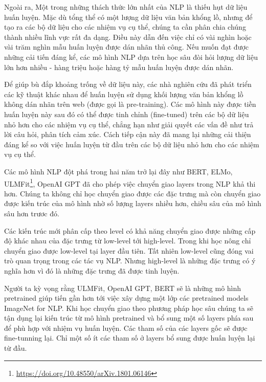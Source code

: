 Ngoài ra, Một trong những thách thức lớn nhất của NLP là thiếu hụt dữ liệu huấn luyện. Mặc dù tổng thể có một lượng dữ liệu văn bản khổng lồ, nhưng để tạo ra các bộ dữ liệu cho các nhiệm vụ cụ thể, chúng ta cần phân chia chúng thành nhiều lĩnh vực rất đa dạng. Điều này dẫn đến việc chỉ có vài nghìn hoặc vài trăm nghìn mẫu huấn luyện được dán nhãn thủ công. Nếu muốn đạt được những cải tiến đáng kể, các mô hình NLP dựa trên học sâu đòi hỏi lượng dữ liệu lớn hơn nhiều - hàng triệu hoặc hàng tỷ mẫu huấn luyện được dán nhãn.

Để giúp bù đắp khoảng trống về dữ liệu này, các nhà nghiên cứu đã phát triển các kỹ thuật khác nhau để huấn luyện sử dụng khối lượng văn bản khổng lồ không dán nhãn trên web (được gọi là pre-training). Các mô hình này được tiền huấn luyện này sau đó có thể được tinh chỉnh (fine-tuned) trên các bộ dữ liệu nhỏ hơn cho các nhiệm vụ cụ thể, chẳng hạn như giải quyết các vấn đề như trả lời câu hỏi, phân tích cảm xúc. Cách tiếp cận này đã mang lại những cải thiện đáng kể so với việc huấn luyện từ đầu trên các bộ dữ liệu nhỏ hơn cho các nhiệm vụ cụ thể. 

Các mô hình NLP đột phá trong hai năm trở lại đây như BERT, ELMo, ULMFit\footnote{\url{https://doi.org/10.48550/arXiv.1801.06146}}, OpenAI GPT đã cho phép việc chuyển giao layers trong NLP khả thi hơn. Chúng ta không chỉ học chuyển giao được các đặc trưng mà còn chuyển giao được kiến trúc của mô hình nhờ số lượng layers nhiều hơn, chiều sâu của mô hình sâu hơn trươc đó.

Các kiến trúc mới phân cấp theo level có khả năng chuyển giao được những cấp độ khác nhau của đặc trưng từ low-level tới high-level. Trong khi học nông chỉ chuyển giao được low-level tại layer đầu tiên. Tất nhiên low-level cũng đóng vai trò quan trọng trong các tác vụ NLP. Nhưng high-level là những đặc trưng có ý nghĩa hơn vì đó là những đặc trưng đã được tinh luyện.

Người ta kỳ vọng rằng ULMFit, OpenAI GPT, BERT sẽ là những mô hình pretrained giúp tiến gần hơn tới việc xây dựng một lớp các pretrained models ImageNet for NLP. Khi học chuyển giao theo phương pháp học sâu chúng ta sẽ tận dụng lại kiến trúc từ mô hình pretrained và bổ sung một số layers phía sau để phù hợp với nhiệm vụ huấn luyện. Các tham số của các layers gốc sẽ được fine-tunning lại. Chỉ một số ít các tham số ở layers bổ sung được huấn luyện lại từ đầu\cite{webpage20}.

